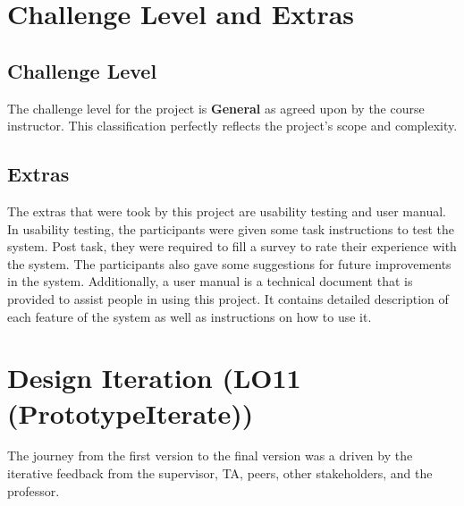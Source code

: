 \documentclass{article}
\begin{document}
\section{Challenge Level and Extras}

\subsection{Challenge Level}

The challenge level for the project is \textbf{General} as agreed upon by the course instructor. This classification perfectly reflects the project's scope and complexity.

\subsection{Extras}

The extras that were took by this project are usability testing and user manual.
In usability testing, the participants were given some task instructions to test the system. Post task, they were required to fill a survey to rate their experience with the system. The participants also gave some suggestions for future improvements in the system.
Additionally, a user manual is a technical document that is provided to assist people in using this project. It contains detailed description of each feature of the system as well as instructions on how to use it. 

\section{Design Iteration (LO11 (PrototypeIterate))}

The journey from the first version to the final version was a driven by the iterative feedback from the supervisor, TA, peers, other stakeholders, and the professor. 
\end{document}
